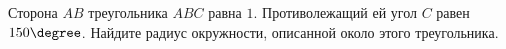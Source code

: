 \begin{ex}
	\begin{condition}
		Сторона \( AB  \) треугольника \( ABC  \) равна \( 1 \). Противолежащий ей угол \( C  \) равен \( 150\degree\). Найдите радиус окружности, описанной около этого треугольника.
	\end{condition}
\end{ex}
